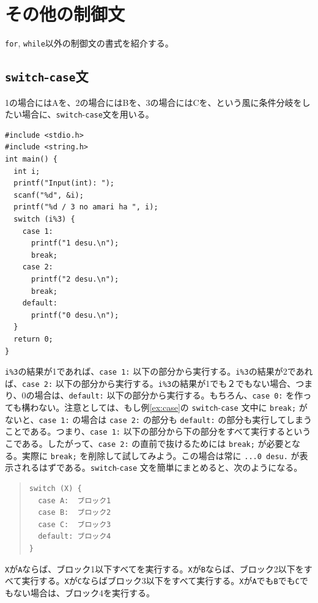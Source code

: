 \section{その他の制御文}

 {\tt for}, {\tt while}以外の制御文の書式を紹介する。

\subsection{{\tt switch}-{\tt case}文}

1の場合にはAを、2の場合にはBを、3の場合にはCを、という風に条件分岐をしたい場合に、\verb|switch|-\verb|case|文を用いる。
\begin{reidai}\label{ex:case}
\begin{verbatim}
#include <stdio.h>
#include <string.h>
int main() {
  int i;
  printf("Input(int): ");
  scanf("%d", &i);
  printf("%d / 3 no amari ha ", i);
  switch (i%3) {
    case 1:
      printf("1 desu.\n");
      break;
    case 2:
      printf("2 desu.\n");
      break;
    default:
      printf("0 desu.\n");
  }
  return 0;
}
\end{verbatim}
\end{reidai} \noindent
\verb|i%3|の結果が1であれば、\verb|case 1:| 以下の部分から実行する。\verb|i%3|の結果が2であれば、\verb|case 2:| 以下の部分から実行する。\verb|i%3|の結果が1でも２でもない場合、つまり、0の場合は、\verb|default:| 以下の部分から実行する。もちろん、\verb|case 0:| を作っても構わない。注意としては、もし例\ref{ex:case}の \verb|switch|-\verb|case| 文中に \verb|break;| がないと、\verb|case 1:| の場合は \verb|case 2:| の部分も \verb|default:| の部分も実行してしまうことである。つまり、\verb|case 1:| 以下の部分から下の部分をすべて実行するというこである。したがって、\verb|case 2:| の直前で抜けるためには \verb|break;| が必要となる。実際に \verb|break;| を削除して試してみよう。この場合は常に \verb|...0 desu.| が表示されるはずである。\verb|switch|-\verb|case| 文を簡単にまとめると、次のようになる。
\begin{quote}
\begin{verbatim}
switch (X) {
  case A:  ブロック1
  case B:  ブロック2
  case C:  ブロック3
  default: ブロック4
}
\end{verbatim}
\end{quote}
\verb|X|が\verb|A|ならば、ブロック1以下すべてを実行する。\verb|X|が\verb|B|ならば、ブロック2以下をすべて実行する。\verb|X|が\verb|C|ならばブロック3以下をすべて実行する。\verb|X|が\verb|A|でも\verb|B|でも\verb|C|でもない場合は、ブロック4を実行する。

